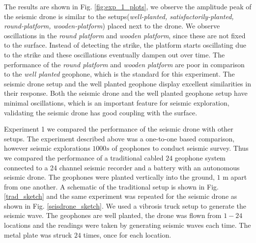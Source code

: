 The results are shown in Fig. \ref{fig:exp_1_plots}, we observe the amplitude peak of the seismic drone is similar to the setups(\emph{well-planted, satisfactorily-planted, round-platform, wooden-platform}) placed next to the drone. We observe oscillations in the \emph{round platform} and \emph{wooden platform}, since these are not fixed to the surface. Instead of detecting the strike, the platform starts oscillating due to the strike and these oscillations eventually dampen out over time. The performance of the \emph{round platform} and \emph{wooden platform} are poor in comparison to the \emph{well planted} geophone, which is the standard for this experiment. The seismic drone setup and the well planted geophone display excellent similarities in their response. Both the seismic drone and the well planted geophone setup have minimal oscillations, which is an important feature for seismic exploration, validating the seismic drone has good coupling with the surface.  

Experiment 1 we compared the performance of the seismic drone with other setups. The experiment described above was a one-to-one based comparison, however seismic explorations $1000s$ of geophones to conduct seismic survey. Thus we compared the performance of a traditional cabled $24$ geophone system connected to a 24 channel seismic recorder and a battery with an autonomous seismic drone. The geophones were planted vertically into the ground, $1$ m apart from one another.  A schematic of the traditional setup is shown in Fig. \ref{trad_sketch} and the same experiment was repeated for the seismic drone as shown in Fig. \ref{seisdrone_sketch}. We used a vibrosis truck setup to generate the seismic wave. The geophones are well planted, the drone was flown from $1-24$ locations and the readings were taken by generating seismic waves each time. The metal plate was struck $24$ times, once for each location.

